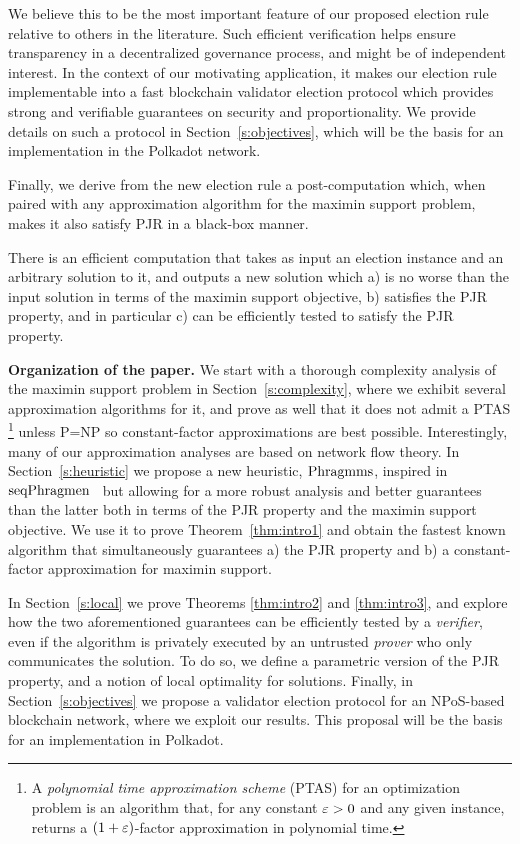  We believe this to be the most important feature of our proposed election rule relative to others in the literature. 
Such efficient verification helps ensure transparency in a decentralized governance process, and might be of independent interest.  
In the context of our motivating application, it makes our election rule implementable into a fast blockchain validator election protocol which provides strong and verifiable guarantees on security and proportionality. 
We provide details on such a protocol in Section~\ref{s:objectives}, which will be the basis for an implementation in the Polkadot network.

Finally, we derive from the new election rule a post-computation which, when paired with any approximation algorithm for the maximin support problem, makes it also satisfy PJR in a black-box manner.

\begin{theorem}\label{thm:intro3}
There is an efficient computation that takes as input an election instance and an arbitrary solution to it, and outputs a new solution which a) is no worse than the input solution in terms of the maximin support objective, b) satisfies the PJR property, and in particular c) can be efficiently tested to satisfy the PJR property.
\end{theorem}

\textbf{Organization of the paper.}
We start with a thorough complexity analysis of the maximin support problem in Section~\ref{s:complexity}, 
where we exhibit several approximation algorithms for it, and prove as well that it does not admit a PTAS%
    \footnote{A \emph{polynomial time approximation scheme} (PTAS) for an optimization problem is an algorithm that, for any constant $\varepsilon>0$ and any given instance, returns a $(1+\varepsilon)$-factor approximation in polynomial time.} %
unless P=NP so constant-factor approximations are best possible. 
Interestingly, many of our approximation analyses are based on network flow theory. 
%
In Section~\ref{s:heuristic} we propose a new heuristic, $\operatorname{Phragmms}$, inspired in $\operatorname{seqPhragmen}$~\cite{brill2017phragmen} but allowing for a more robust analysis and better guarantees than the latter both in terms of the PJR property and the maximin support objective. We use it to prove Theorem~\ref{thm:intro1} and obtain the fastest known algorithm that simultaneously guarantees a) the PJR property and b) a constant-factor approximation for maximin support.

In Section~\ref{s:local} we prove Theorems \ref{thm:intro2} and \ref{thm:intro3}, and explore how the two aforementioned guarantees can be efficiently tested by a \emph{verifier}, even if the algorithm is privately executed by an untrusted \emph{prover} who only communicates the solution. 
To do so, we define a parametric version of the PJR property, and a notion of local optimality for solutions. 
%
Finally, in Section~\ref{s:objectives} we propose a validator election protocol for an NPoS-based blockchain network, where we exploit our results. This proposal will be the basis for an implementation in Polkadot. 
